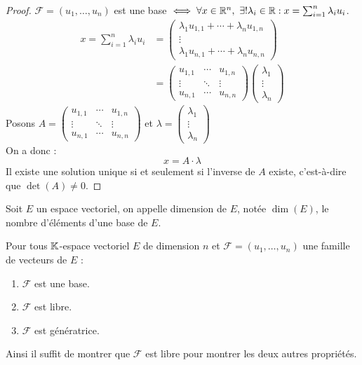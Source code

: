 \begin{proof}
	$\mathcal{F} = (u_1, \ldots, u_n)$ est une base $\iff \forall x \in \R^n,\ \exists ! \lambda_i \in \R : x = \sum_{i=1}^{n} \lambda_i u_i$.
	\begin{align*}
		x = \sum_{i=1}^{n} \lambda_i u_i &= 
		\begin{pmatrix}
			\lambda_1 u_{1,1} + \cdots + \lambda_n u_{1,n} \\
			\vdots \\
			\lambda_1 u_{n,1} + \cdots + \lambda_n u_{n,n}
		\end{pmatrix}
		\\
		&= 
		\begin{pmatrix}
			u_{1,1} & \cdots & u_{1,n} \\
			\vdots & \ddots & \vdots \\
			u_{n,1} & \cdots & u_{n,n}
		\end{pmatrix}
		\begin{pmatrix}
			\lambda_1 \\
			\vdots \\
			\lambda_n
		\end{pmatrix}
	\end{align*}
	Posons 
	$
	A =
	\begin{pmatrix}
		u_{1,1} & \cdots & u_{1,n} \\
		\vdots & \ddots & \vdots \\
		u_{n,1} & \cdots & u_{n,n}
	\end{pmatrix}
	$
	et 
	$\lambda =
	\begin{pmatrix}
		\lambda_1 \\
		\vdots \\
		\lambda_n
	\end{pmatrix}
	$\\
	On a donc :
	\[ x = A \cdot \lambda \]
	Il existe une solution unique si et seulement si l'inverse de $A$ existe, c'est-à-dire que $\det(A) \neq 0$.
\end{proof}

\begin{definition}
	Soit $E$ un espace vectoriel, on appelle dimension de $E$, notée $\dim(E)$, le nombre d'éléments d'une base de $E$. 
\end{definition}

\begin{proposition}
	Pour tous $\mathbb{K}$-espace vectoriel $E$ de dimension $n$ et $\mathcal{F} = (u_1, \ldots, u_n)$ une famille de vecteurs de $E$ :
	\begin{enumerate}
		\item $\mathcal{F}$ est une base.
		\item $\mathcal{F}$ est libre.
		\item $\mathcal{F}$ est génératrice.
	\end{enumerate}
	\noindent Ainsi il suffit de montrer que $\mathcal{F}$ est libre pour montrer les deux autres propriétés.
\end{proposition}

